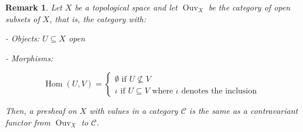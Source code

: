 \documentclass{article}
\newtheorem{remark}[theorem]{Remark}
\begin{document}
\begin{remark}
Let $X$ be a topological space and let $\operatorname{Ouv}_{X}$ be the category of open subsets of $X$, that is, the category with:

- Objects: $U \subseteq X$ open

- Morphisms:

$$
\operatorname{Hom}(U, V)=\left\{\begin{array}{l}
\emptyset \text { if } U \nsubseteq V \\
\iota \text { if } U \subseteq V \text { where } \iota \text { denotes the inclusion }
\end{array}\right.
$$

Then, a presheaf on $X$ with values in a category $\mathcal{C}$ is the same as a contravariant functor from $\operatorname{Ouv}_{X}$ to $\mathcal{C}$.
\end{remark}
\end{document}
